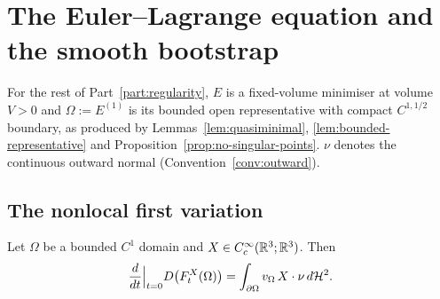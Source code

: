 \chapter{The Euler--Lagrange equation and the smooth bootstrap}
\label{ch:euler-lagrange}

\begin{notation}\label{not:minimizer-rep}
For the rest of Part~\ref{part:regularity}, $E$ is a fixed-volume minimiser at
volume $V>0$ and $\Omega:=E^{(1)}$ is its bounded open representative with
compact $C^{1,1/2}$ boundary, as produced by
Lemmas~\ref{lem:quasiminimal}, \ref{lem:bounded-representative} and
Proposition~\ref{prop:no-singular-points}.  $\nu$ denotes the continuous
outward normal (Convention~\ref{conv:outward}).
\end{notation}

\section{The nonlocal first variation}

\begin{lemma}\label{lem:coulomb-first-var}
Let $\Omega$ be a bounded $C^1$ domain and $X\in C^\infty_c(\mathbb R^3;\mathbb R^3)$.  Then
\begin{equation}\label{eq:coulomb-first-var}
  \frac{d}{dt}\Big|_{t=0}D\bigl(F^X_t(\Omega)\bigr)
  =\int_{\partial\Omega}v_\Omega\,X\cdot\nu\,d\mathcal H^2 .
\end{equation}
\end{lemma}

